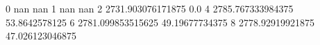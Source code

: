 0 nan nan
1 nan nan
2 2731.903076171875 0.0
4 2785.767333984375 53.8642578125
6 2781.099853515625 49.19677734375
8 2778.92919921875 47.026123046875
